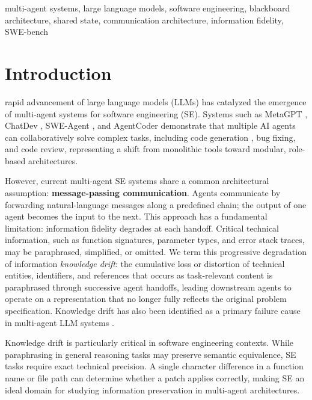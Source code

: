 \documentclass{ieeeaccess}
\begin{document}
\begin{keywords}
multi-agent systems, large language models, software engineering, blackboard architecture, shared state, communication architecture, information fidelity, SWE-bench
\end{keywords}

\titlepgskip=-21pt

\maketitle

\section{Introduction}

 rapid advancement of large language models (LLMs) \cite{brown2020language} has catalyzed the emergence of multi-agent systems for software engineering (SE). Systems such as MetaGPT \cite{hong2024metagpt}, ChatDev \cite{qian2024chatdev}, SWE-Agent \cite{yang2024sweagent}, and AgentCoder \cite{huang2024agentcoder} demonstrate that multiple AI agents can collaboratively solve complex tasks, including code generation \cite{chen2021evaluating}, bug fixing, and code review, representing a shift from monolithic tools toward modular, role-based architectures.

However, current multi-agent SE systems share a common architectural assumption: \textbf{message-passing communication}. Agents communicate by forwarding natural-language messages along a predefined chain; the output of one agent becomes the input to the next. This approach has a fundamental limitation: information fidelity degrades at each handoff. Critical technical information, such as function signatures, parameter types, and error stack traces, may be paraphrased, simplified, or omitted. We term this progressive degradation of information \emph{knowledge drift}: the cumulative loss or distortion of technical entities, identifiers, and references that occurs as task-relevant content is paraphrased through successive agent handoffs, leading downstream agents to operate on a representation that no longer fully reflects the original problem specification. Knowledge drift has also been identified as a primary failure cause in multi-agent LLM systems \cite{cemri2025why}.

Knowledge drift is particularly critical in software engineering contexts. While paraphrasing in general reasoning tasks may preserve semantic equivalence, SE tasks require exact technical precision. A single character difference in a function name or file path can determine whether a patch applies correctly, making SE an ideal domain for studying information preservation in multi-agent architectures.
\end{document}
